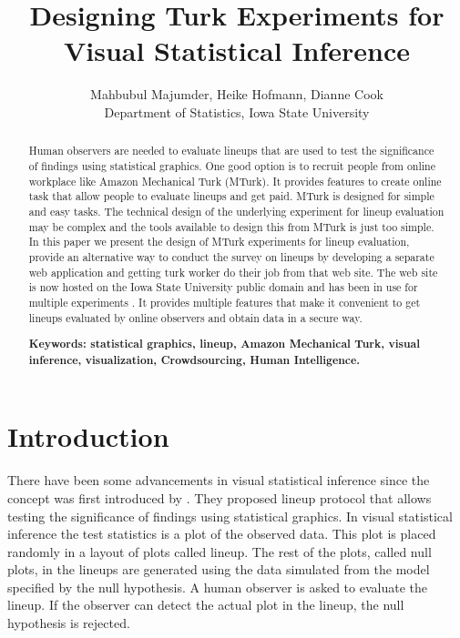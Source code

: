 \documentclass[11pt]{article}
\title{Designing Turk Experiments for Visual Statistical Inference}
\author{Mahbubul Majumder, Heike Hofmann, Dianne Cook\\
        Department of Statistics, Iowa State University}
\begin{document}
\tableofcontents

\maketitle


\begin {abstract} 

Human observers are needed to evaluate lineups that are used to test the significance of findings using statistical graphics. One good option is to recruit people from online workplace like Amazon Mechanical Turk (MTurk). It provides features to create online task that allow people to evaluate lineups and get paid. MTurk is designed for simple and easy tasks. The technical design of the underlying experiment for lineup evaluation may be complex and the tools available to design this from MTurk is just too simple. In this paper we present the design of MTurk experiments for lineup evaluation, provide an alternative way to conduct the survey on lineups by developing a separate web application and getting turk worker do their job from that web site. The web site is now hosted on the Iowa State University public domain and has been in use for multiple experiments \citep{majumder:turk}. It provides multiple features that make it convenient to get lineups evaluated by online observers and obtain data in a secure way.

{\bf Keywords: \sf statistical graphics, lineup, Amazon Mechanical Turk, visual inference, visualization, Crowdsourcing, Human Intelligence.}

\end {abstract}


\section{Introduction} 

There have been some advancements in visual statistical inference since the concept was first introduced by \cite{buja:2009}. They  proposed lineup protocol that allows testing the significance of findings using statistical graphics. In visual statistical inference the test statistics is a plot of the observed data. This plot is placed randomly in a layout of plots called lineup. The rest of the plots, called null plots, in the lineups are generated using the data simulated from the model specified by the null hypothesis. A human observer is asked to evaluate the lineup. If the observer can detect the actual plot in the lineup, the null hypothesis is rejected. 
\end{document}
